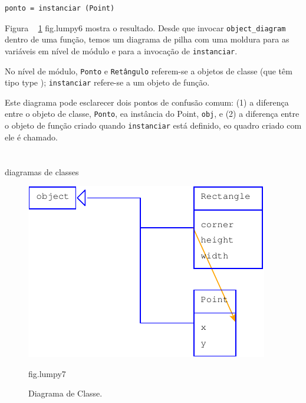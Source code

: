 \documentclass[10pt]{book}
\begin{document}
\begin{v erbatim}
{\begin{verbatim}
ponto = instanciar (Point)
\end{verbatim}

Figura ~ \ref {} fig.lumpy6 mostra o resultado. Desde que invocar
\Verb "object_diagram" dentro de uma função, temos um diagrama de pilha
com uma moldura para as variáveis ​​em nível de módulo e para a invocação
de {\tt instanciar}.

No nível de módulo, {\tt Ponto} e {\tt Retângulo} referem-se a
objetos de classe (que têm tipo {type \tt}); {\tt instanciar}
refere-se a um objeto de função.

Este diagrama pode esclarecer dois pontos de confusão comum: (1) a
diferença entre o objeto de classe, {\tt Ponto}, ea instância do
Point, {\tt obj}, e (2) a diferença entre o objeto de função
criado quando {\tt instanciar} está definido, eo quadro criado com
ele é chamado.


\section{} diagramas de classes

\begin{figure}
\centerline
{\includegraphics[scale = 0.7] {figs/lumpydemo7.pdf}}
\caption{Diagrama de Classe.}
\label{} fig.lumpy7
\end{figure}

}
\end{v erbatim}
\end{document}
